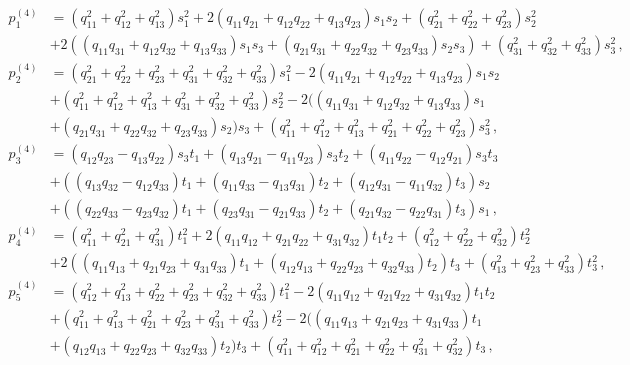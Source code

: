 \documentclass[10pt]{amsart}
\theoremstyle{definition}
\theoremstyle{corollary}
\theoremstyle{remark}
\theoremstyle{conclusion}
\begin{document}
\begin{align}
p_1^{(4)}&= (q_{11}^2 + q_{12}^2  + q_{13}^2) s_1^2 + 2 (q_{11} q_{21}  + 
q_{12} q_{22}  +  q_{13} q_{23})s_1 s_2 + (q_{21}^2 + q_{22}^2  + 
q_{23}^2) s_2^2 \nonumber \\
&+ 
2 ((q_{11} q_{31}  + q_{12} q_{32}  + q_{13} q_{33})s_1 s_3  + (q_{21} q_{31}  + q_{22} q_{32}  + 
q_{23} q_{33})s_2 s_3)  + (q_{31}^2 + q_{32}^2 + q_{33}^2) s_3^2 \, , \nonumber \\
p_2^{(4)}&= (q_{21}^2  + q_{22}^2  + q_{23}^2  + q_{31}^2  + q_{32}^2  + 
q_{33}^2) s_1^2 - 2 (q_{11} q_{21}  + q_{12} q_{22}  + q_{13} q_{23} )s_1 s_2 \nonumber  \\
& + 
(q_{11}^2 + q_{12}^2 + q_{13}^2  + q_{31}^2  + q_{32}^2 + 
q_{33}^2 )s_2^2 - 2 ((q_{11} q_{31}  + q_{12} q_{32}  + q_{13} q_{33})s_1 \nonumber  \\
&+ (q_{21} q_{31} + q_{22} q_{32}  + 
q_{23} q_{33}) s_2) s_3 + (q_{11}^2 + q_{12}^2 + q_{13}^2 + q_{21}^2 + q_{22}^2 + 
q_{23}^2) s_3^2 \, ,\nonumber   \\
p_3^{(4)}&= (q_{12} q_{23}  - q_{13} q_{22} ) s_3 t_1 + (q_{13} q_{21} - q_{11} q_{23}) s_3 t_2 + (q_{11} q_{22} - 
q_{12} q_{21}) s_3 t_3\nonumber  \\
&+ ((q_{13} q_{32} - q_{12} q_{33}) t_1 + (q_{11} q_{33} - 
q_{13} q_{31}) t_2 + (q_{12} q_{31} - q_{11} q_{32}) t_3) s_2 \nonumber \\
&+ ((q_{22} q_{33} - 
q_{23} q_{32}) t_1 + (q_{23} q_{31} - q_{21} q_{33}) t_2 + (q_{21} q_{32} - 
q_{22} q_{31} ) t_3) s_1 \, , \nonumber  \\
p_4^{(4)}&=(q_{11}^2 + q_{21}^2 + q_{31}^2) t_1^2 + 
2 (q_{11} q_{12} + q_{21} q_{22} + q_{31} q_{32}) t_1 t_2 + (q_{12}^2 + q_{22}^2 + 
q_{32}^2) t_2^2\nonumber  \\
&+ 2 ((q_{11} q_{13} + q_{21} q_{23} + q_{31} q_{33}) t_1 + (q_{12} q_{13} + q_{22} q_{23} + 
q_{32} q_{33}) t_2) t_3 + (q_{13}^2 + q_{23}^2 + q_{33}^2) t_3^2 \, , \nonumber  \\
p_5^{(4)}&=(q_{12}^2 + q_{13}^2 + q_{22}^2 + q_{23}^2 + q_{32}^2 + q_{33}^2) t_1^2 - 
2 (q_{11} q_{12} + q_{21} q_{22} + q_{31} q_{32}) t_1 t_2 \nonumber \\
&+ (q_{11}^2 + q_{13}^2 + q_{21}^2 + 
q_{23}^2 + q_{31}^2 + q_{33}^2) t_2^2 - 
2 ((q_{11} q_{13} + q_{21} q_{23} + q_{31} q_{33}) t_1 \nonumber \\
& + (q_{12} q_{13} + q_{22} q_{23} + 
q_{32} q_{33}) t_2) t_3 + (q_{11}^2 + q_{12}^2 + q_{21}^2 + q_{22}^2 + q_{31}^2 + 
q_{32}^2) t_3 \, ,  \nonumber \\

\end{align}
\end{document}

